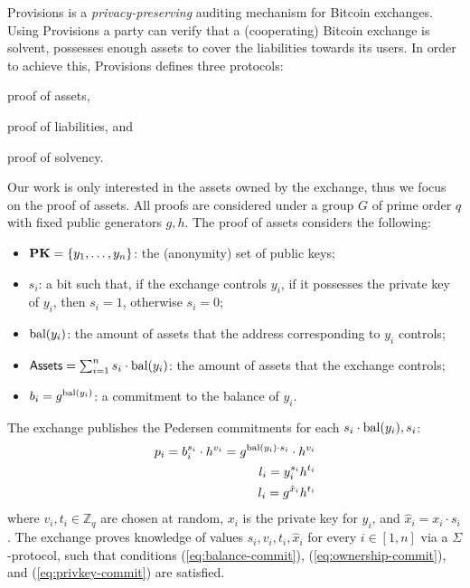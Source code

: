 Provisions is a \emph{privacy-preserving} auditing mechanism for Bitcoin
exchanges. Using Provisions a party can verify that a (cooperating) Bitcoin
exchange is solvent, \ie possesses enough assets to cover the liabilities
towards its users. In order to achieve this, Provisions defines three
protocols:
\begin{inparaenum}[i)]
    \item proof of assets,
    \item proof of liabilities, and
    \item proof of solvency.
\end{inparaenum}
Our work is only interested in the assets owned by the exchange, thus we focus
on the proof of assets. All proofs are considered under a group
$G$ of prime order $q$ with fixed public generators $g, h$. The proof of assets
considers the following:
\begin{itemize}
    \item $\text{\textbf{PK}} = \{y_1, \dots, y_n \}$: the (anonymity) set of public keys;
    \item $s_i$: a bit such that, if the exchange controls $y_i$, \ie if it possesses the private key of $y_i$, then $s_i = 1$, otherwise $s_i = 0$;
    \item $\text{bal}(y_i)$: the amount of assets that the address corresponding to $y_i$ controls;
    \item $\mathsf{Assets} = \sum_{i = 1}^n s_i \cdot \text{bal}(y_i)$: the amount of assets that the exchange controls;
    \item $b_i = g^{\text{bal}(y_i)}$: a commitment to the balance of $y_i$.
\end{itemize}

The exchange publishes the Pedersen commitments for each $s_i \cdot
\text{bal}(y_i), s_i$:
\begin{align}
    p_i = b_i^{s_i} \cdot h^{v_i} = g^{\text{bal}(y_i) \cdot s_i} \cdot h^{v_i} \label{eq:balance-commit} \\
    l_i = y_i^{s_i}h^{t_i} \label{eq:ownership-commit} \\
    l_i = g^{\hat{x}_i}h^{t_i} \label{eq:privkey-commit}
\end{align}
where $v_i, t_i \in \mathbb{Z}_q$ are chosen at random,
$x_i$ is the private key for $y_i$, and $\hat{x}_i = x_i \cdot s_i$.
The exchange proves knowledge of values $s_i, v_i, t_i, \hat{x}_i$ for every $i
\in [1, n]$ via a $\Sigma$-protocol, such that conditions
(\ref{eq:balance-commit}), (\ref{eq:ownership-commit}), and
(\ref{eq:privkey-commit}) are satisfied.

